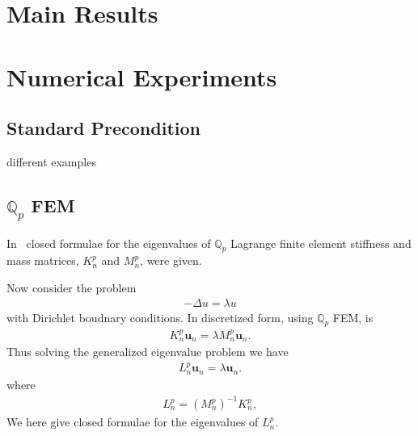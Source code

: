 \documentclass[10pt]{article}
\newcommand{\comm}[1]{{\color{red}{#1}}}
\begin{document}
\section{Main Results}
\section{Numerical Experiments}
\subsection{Standard Precondition}
 different examples
\subsection{$\mathbb{Q}_p$ FEM}
In~\cite{ekstrom181} closed formulae for the eigenvalues of $\mathbb{Q}_p$ Lagrange finite element stiffness and mass matrices, $K_n^{p}$ and $M_n^{p}$, were given. 


Now consider the problem
\begin{align}
-\Delta u=\lambda u
\end{align}
with Dirichlet boudnary conditions. In discretized form, using $\mathbb{Q}_p$ FEM, is
\begin{align}
K_n^{p}\mathbf{u}_n=\lambda M_n^{p}\mathbf{u}_n.
\end{align}
Thus solving the generalized eigenvalue problem we have
\begin{align}
L_n^{p}\mathbf{u}_n=\lambda \mathbf{u}_n.
\end{align}
where
\begin{align}
L_n^{p}=(M_n^{p})^{-1}K_n^{p},
\end{align}
We here give closed formulae for the eigenvalues of $L_n^{p}$.

\comm{insert correct scalings}

\comm{insert algorithm, see Code/Experiments/newblock.m}
\end{document}
